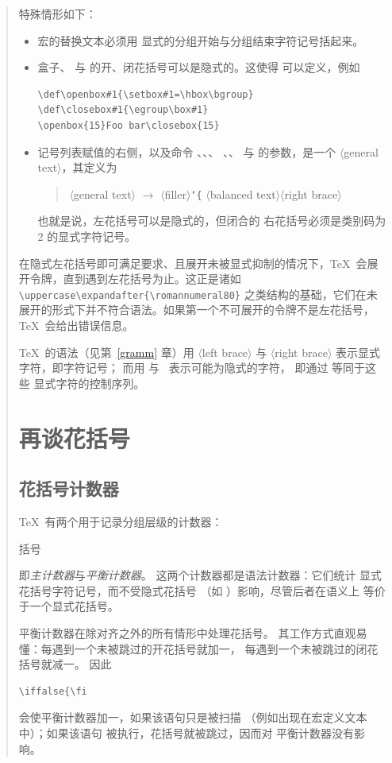\documentclass[a4paper]{rapport3}
\def\lb{{\tt\char`\{}}\def\rb{{\tt\char`\}}}
\def\gr#1{$\langle$#1$\rangle$}\def\key#1{{\tt#1}}
\newenvironment{disp}{\begin{quotation}}{\end{quotation}}
\newenvironment{Disp}{\begin{quotation}}{\end{quotation}}
\def\term#1\par{\index{#1}}
\begin{document}
\begin{disp}
特殊情形如下：
\begin{itemize} \item 宏的替换文本必须用
显式的分组开始与分组结束字符记号括起来。
\item  盒子、
与  的开、闭花括号可以是隐式的。这使得
可以定义，例如
\begin{verbatim}
\def\openbox#1{\setbox#1=\hbox\bgroup}
\def\closebox#1{\egroup\box#1}
\openbox{15}Foo bar\closebox{15}
\end{verbatim}
\item 记号列表赋值的右侧，以及命令 、、、
、、
 与  的参数，是一个 \gr{general text}，其定义为
\begin{Disp} \gr{general text} $\longrightarrow$ \gr{filler}\lb
      \gr{balanced text}\gr{right brace}\end{Disp}
也就是说，左花括号可以是隐式的，但闭合的
右花括号必须是类别码为 2 的显式字符记号。 \end{itemize}

在隐式左花括号即可满足要求、且展开未被显式抑制的情况下，\TeX\ 会展开令牌，直到遇到左花括号为止。这正是诸如
\verb=\uppercase\expandafter{\romannumeral80}=
之类结构的基础，它们在未展开的形式下并不符合语法。如果第一个不可展开的令牌不是左花括号，\TeX\ 会给出错误信息。

\TeX\ 的语法（见第~\ref{gramm} 章）用
\gr{left brace} 与 \gr{right brace} 表示显式
字符，即字符记号；
而用 \n{\lb} 与~\n{\rb} 
表示可能为隐式的字符，
\altt
即通过  等同于这些
显式字符的控制序列。

\section{再谈花括号}


\subsection{花括号计数器}

\TeX\ 有两个用于记录分组层级的计数器：
\term 花括号\par
即{\it 主计数器}与{\it 平衡计数器}。
这两个计数器都是语法计数器：它们统计
显式花括号字符记号，而不受隐式花括号
（如 ）影响，尽管后者在语义上
等价于一个显式花括号。

平衡计数器在除对齐之外的所有情形中处理花括号。
其工作方式直观易懂：每遇到一个未被跳过的开花括号就加一，
每遇到一个未被跳过的闭花括号就减一。
因此
\begin{verbatim}
\iffalse{\fi
\end{verbatim}
会使平衡计数器加一，如果该语句只是被扫描
（例如出现在宏定义文本中）；如果该语句
被执行，花括号就被跳过，因而对
平衡计数器没有影响。


\end{disp}
\end{document}
